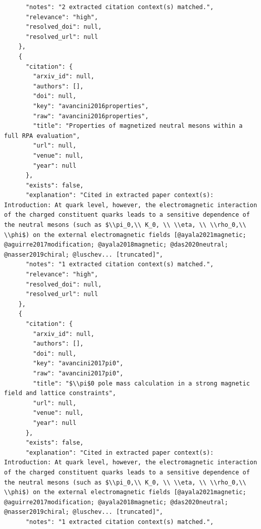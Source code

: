 \documentclass[11pt]{article}
\begin{document}
\begin{verbatim}
      "notes": "2 extracted citation context(s) matched.",
      "relevance": "high",
      "resolved_doi": null,
      "resolved_url": null
    },
    {
      "citation": {
        "arxiv_id": null,
        "authors": [],
        "doi": null,
        "key": "avancini2016properties",
        "raw": "avancini2016properties",
        "title": "Properties of magnetized neutral mesons within a full RPA evaluation",
        "url": null,
        "venue": null,
        "year": null
      },
      "exists": false,
      "explanation": "Cited in extracted paper context(s): Introduction: At quark level, however, the electromagnetic interaction of the charged constituent quarks leads to a sensitive dependence of the neutral mesons (such as $\\pi_0,\\ K_0, \\ \\eta, \\ \\rho_0,\\ \\phi$) on the external electromagnetic fields [@ayala2021magnetic; @aguirre2017modification; @ayala2018magnetic; @das2020neutral; @nasser2019chiral; @luschev... [truncated]",
      "notes": "1 extracted citation context(s) matched.",
      "relevance": "high",
      "resolved_doi": null,
      "resolved_url": null
    },
    {
      "citation": {
        "arxiv_id": null,
        "authors": [],
        "doi": null,
        "key": "avancini2017pi0",
        "raw": "avancini2017pi0",
        "title": "$\\pi$0 pole mass calculation in a strong magnetic field and lattice constraints",
        "url": null,
        "venue": null,
        "year": null
      },
      "exists": false,
      "explanation": "Cited in extracted paper context(s): Introduction: At quark level, however, the electromagnetic interaction of the charged constituent quarks leads to a sensitive dependence of the neutral mesons (such as $\\pi_0,\\ K_0, \\ \\eta, \\ \\rho_0,\\ \\phi$) on the external electromagnetic fields [@ayala2021magnetic; @aguirre2017modification; @ayala2018magnetic; @das2020neutral; @nasser2019chiral; @luschev... [truncated]",
      "notes": "1 extracted citation context(s) matched.",

\end{verbatim}
\end{document}
